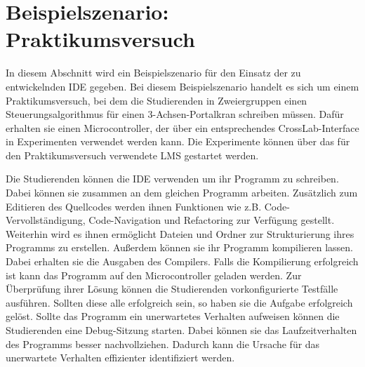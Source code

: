 \section{Beispielszenario: Praktikumsversuch}\label{section:anforderungsanalyse:beispielszenario}

In diesem Abschnitt wird ein Beispielszenario für den Einsatz der zu entwickelnden IDE gegeben. Bei diesem Beispielszenario handelt es sich um einem Praktikumsversuch, bei dem die Studierenden in Zweiergruppen einen Steuerungsalgorithmus für einen 3-Achsen-Portalkran schreiben müssen. Dafür erhalten sie einen Microcontroller, der über ein entsprechendes CrossLab-Interface in Experimenten verwendet werden kann. Die Experimente können über das für den Praktikumsversuch verwendete \ac{LMS} gestartet werden.

Die Studierenden können die IDE verwenden um ihr Programm zu schreiben. Dabei können sie zusammen an dem gleichen Programm arbeiten. Zusätzlich zum Editieren des Quellcodes werden ihnen Funktionen wie z.B. Code-Vervollständigung, Code-Navigation und Refactoring zur Verfügung gestellt. Weiterhin wird es ihnen ermöglicht Dateien und Ordner zur Strukturierung ihres Programms zu erstellen. Außerdem können sie ihr Programm kompilieren lassen. Dabei erhalten sie die Ausgaben des Compilers. Falls die Kompilierung erfolgreich ist kann das Programm auf den Microcontroller geladen werden. Zur Überprüfung ihrer Lösung können die Studierenden vorkonfigurierte Testfälle ausführen. Sollten diese alle erfolgreich sein, so haben sie die Aufgabe erfolgreich gelöst. Sollte das Programm ein unerwartetes Verhalten aufweisen können die Studierenden eine Debug-Sitzung starten. Dabei können sie das Laufzeitverhalten des Programms besser nachvollziehen. Dadurch kann die Ursache für das unerwartete Verhalten effizienter identifiziert werden.



